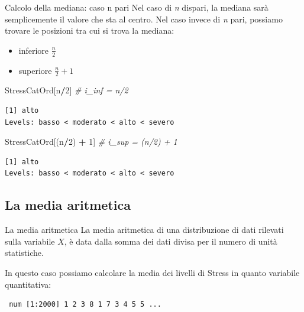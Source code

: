 \documentclass[
  ignorenonframetext,
  compress, aspectratio=149]{beamer}
\newenvironment{Shaded}{\begin{snugshade}}{\end{snugshade}}
\newcommand{\CommentTok}[1]{\textcolor[rgb]{0.56,0.35,0.01}{\textit{#1}}}
\newcommand{\DecValTok}[1]{\textcolor[rgb]{0.00,0.00,0.81}{#1}}
\newcommand{\FunctionTok}[1]{\textcolor[rgb]{0.13,0.29,0.53}{\textbf{#1}}}
\newcommand{\NormalTok}[1]{#1}
\newcommand{\SpecialCharTok}[1]{\textcolor[rgb]{0.81,0.36,0.00}{\textbf{#1}}}
\providecommand{\tightlist}{%
  \setlength{\itemsep}{0pt}\setlength{\parskip}{0pt}}
\begin{document}
\begin{frame}[fragile]{Calcolo della mediana: caso n pari}
\label{calcolo-della-mediana-caso-n-pari}
Nel caso di \emph{n} dispari, la mediana sarà semplicemente il valore
che sta al centro. Nel caso invece di \emph{n} pari, possiamo trovare le
posizioni tra cui si trova la mediana:

\begin{itemize}
\tightlist
\item
  inferiore \(\frac{n}{2}\)
\item
  superiore \(\frac{n}{2} + 1\)
\end{itemize}

\begin{Shaded}
\begin{Highlighting}[]
\NormalTok{StressCatOrd[n}\SpecialCharTok{/}\DecValTok{2}\NormalTok{] }\CommentTok{\# i\_inf = n/2}
\end{Highlighting}
\end{Shaded}

\begin{verbatim}
[1] alto
Levels: basso < moderato < alto < severo
\end{verbatim}

\begin{Shaded}
\begin{Highlighting}[]
\NormalTok{StressCatOrd[(n}\SpecialCharTok{/}\DecValTok{2}\NormalTok{) }\SpecialCharTok{+} \DecValTok{1}\NormalTok{] }\CommentTok{\# i\_sup = (n/2) + 1}
\end{Highlighting}
\end{Shaded}

\begin{verbatim}
[1] alto
Levels: basso < moderato < alto < severo
\end{verbatim}
\end{frame}

\subsection{La media aritmetica}\label{la-media-aritmetica}

\begin{frame}[fragile]{La media aritmetica}
La media aritmetica di una distribuzione di dati rilevati sulla
variabile \(X\), è data dalla somma dei dati divisa per il numero di
unità statistiche.

In questo caso possiamo calcolare la media dei livelli di Stress in
quanto variabile quantitativa:

\begin{Shaded}
\end{Shaded}

\begin{verbatim}
 num [1:2000] 1 2 3 8 1 7 3 4 5 5 ...
\end{verbatim}
\end{frame}
\end{document}
